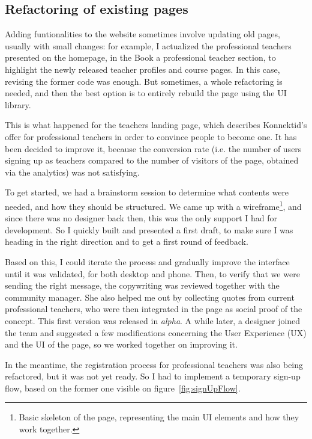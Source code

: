 \subsection{Refactoring of existing pages}
\label{ssec:refactor}

Adding funtionalities to the website sometimes involve updating old pages, usually with small changes: for example, I actualized the professional teachers presented on the homepage, in the \guillemotleft{} Book a professional teacher \guillemotright{} section, to highlight the newly released teacher profiles and course pages. In this case, revising the former code was enough. But sometimes, a whole refactoring is needed, and then the best option is to entirely rebuild the page using the UI library. 

This is what happened for the teachers landing page, which describes Konnektid's offer for professional teachers in order to convince people to become one. It has been decided to improve it, because the conversion rate (i.e. the number of users signing up as teachers compared to the number of visitors of the page, obtained via the analytics) was not satisfying. 

To get started, we had a brainstorm session to determine what contents were needed, and how they should be structured. We came up with a wireframe\footnote{Basic skeleton of the page, representing the main UI elements and how they work together.}, and since there was no designer back then, this was the only support I had for development. So I quickly built and presented a first draft, to make sure I was heading in the right direction and to get a first round of feedback.

Based on this, I could iterate the process and gradually improve the interface until it was validated, for both desktop and phone. Then, to verify that we were sending the right message, the copywriting was reviewed together with the community manager. She also helped me out by collecting quotes from current professional teachers, who were then integrated in the page as social proof of the concept. This first version was released in \textit{alpha}. A while later, a designer joined the team and suggested a few modifications concerning the User Experience (UX) and the UI of the page, so we worked together on improving it. 

In the meantime, the registration process for professional teachers was also being refactored, but it was not yet ready. So I had to implement a temporary sign-up flow, based on the former one visible on {\sc figure}~\ref{fig:signUpFlow}.

